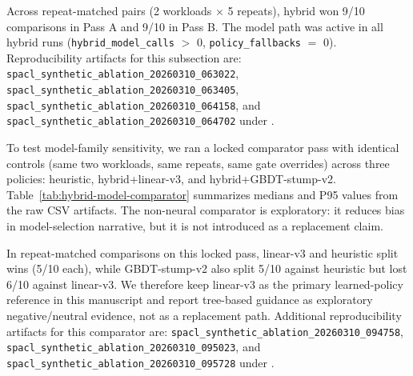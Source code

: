 \documentclass[preprint,12pt,times]{elsarticle}
\begin{document}
Across repeat-matched pairs (2 workloads \(\times\) 5 repeats), hybrid won 9/10 comparisons in Pass A and 9/10 in Pass B. The model path was active in all hybrid runs (\texttt{hybrid\_model\_calls} \(>\) 0, \texttt{policy\_fallbacks} \(=\) 0). Reproducibility artifacts for this subsection are:
\texttt{spacl\_synthetic\_ablation\_20260310\_063022},
\texttt{spacl\_synthetic\_ablation\_20260310\_063405},
\texttt{spacl\_synthetic\_ablation\_20260310\_064158}, and
\texttt{spacl\_synthetic\_ablation\_20260310\_064702}
under .

To test model-family sensitivity, we ran a locked comparator pass with identical controls (same two workloads, same repeats, same gate overrides) across three policies: heuristic, hybrid+linear-v3, and hybrid+GBDT-stump-v2. Table~\ref{tab:hybrid-model-comparator} summarizes medians and P95 values from the raw CSV artifacts. The non-neural comparator is exploratory: it reduces bias in model-selection narrative, but it is not introduced as a replacement claim.

\begin{table}[htbp]
\centering
\caption{Hybrid model-family comparator on locked mixed-operand controls (5 repeats; lower is better)}
\label{tab:hybrid-model-comparator}
\end{table}

In repeat-matched comparisons on this locked pass, linear-v3 and heuristic split wins (5/10 each), while GBDT-stump-v2 also split 5/10 against heuristic but lost 6/10 against linear-v3. We therefore keep linear-v3 as the primary learned-policy reference in this manuscript and report tree-based guidance as exploratory negative/neutral evidence, not as a replacement path. Additional reproducibility artifacts for this comparator are:
\texttt{spacl\_synthetic\_ablation\_20260310\_094758},
\texttt{spacl\_synthetic\_ablation\_20260310\_095023}, and
\texttt{spacl\_synthetic\_ablation\_20260310\_095728}
under .
\end{document}
